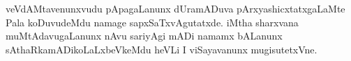 veVdAMtavenunxvudu pApagaLanunx dUramADuva pArxyashicxtatxgaLaMte Pala koDuvudeMdu namage sapxSaTxvAgutatxde. iMtha sharxvana muMtAdavugaLanunx nAvu sariyAgi mADi namamx bALanunx sAthaRkamADikoLaLxbeVkeMdu heVLi I viSayavanunx mugisutetxVne.
















































































































